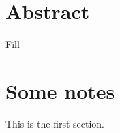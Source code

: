 \documentclass[12pt, a4paper, oneside, headinclude, footinclude,english]{article}
\title{\normalfont\spacedallcaps{Title}}
\author{\spacedlowsmallcaps{Krishna Bhogaonker}}
\date{\today\\version 0.1}
\begin{document}
\renewcommand{\sectionmark}[1]{\markright{\spacedlowsmallcaps{#1}}} 
\lehead{\mbox{\llap{\small\thepage\kern1em\color{halfgray} \vline}\color{halfgray}\hspace{0.5em}\rightmark\hfil}} 



\pagestyle{scrheadings} 


\maketitle 

\setcounter{tocdepth}{2}

\tableofcontents 




\section*{Abstract}

Fill






\section{ Some notes}

This is the first section. 


\renewcommand{\refname}{\spacedlowsmallcaps{References}} 





\end{document}
